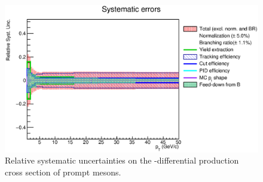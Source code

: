 \begin{figure}[tb]
\begin{center}
 \includegraphics[width=1\textwidth]{figures/Dstar/pp13TeV/RelativeSystematics.eps}
\caption{Relative systematic uncertainties on the \pt -differential production cross
section of prompt \Dstar mesons.}
\end{center}
\end{figure}
